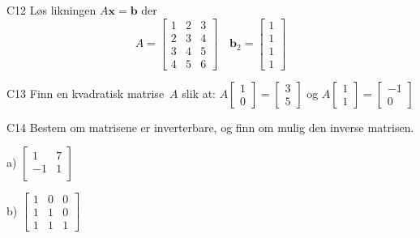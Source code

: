 \documentclass[a4paper,norsk,11pt]{interaktiv}
\newcommand{\V}[1]{\mathbf{#1}}
\newcommand{\vv}[2]{\begin{bmatrix} #1 \\ #2 \end{bmatrix}}
\begin{document}
\begin{oppgave}{C12}
Løs likningen
$A\V{x}=\V{b}$  
der
\[
A=\begin{bmatrix}
	1 & 2 & 3\\
	2 & 3 & 4\\
	3 & 4 & 5\\
	4 & 5 & 6
	\end{bmatrix}
\quad
\V{b}_2=
	\begin{bmatrix}
	1  \\
	1 \\
	1 \\
	1
	\end{bmatrix}
\]
\end{oppgave}


\begin{oppgave}{C13}
Finn en kvadratisk matrise~$A$ slik at:
$A \vv{1}{0} = \vv{3}{5}$
og
$A \vv{1}{1} = \vv{-1}{0}$
\end{oppgave}


\begin{oppgave}{C14}
Bestem om matrisene er inverterbare, og finn om mulig den inverse matrisen.


a)
$\begin{bmatrix}
1 & 7 \\
-1 & 1 \\
\end{bmatrix}$



b)
$\begin{bmatrix}
1 & 0 & 0\\
1 & 1 & 0\\
1 & 1 & 1
\end{bmatrix}$


\end{oppgave}
\end{document}
